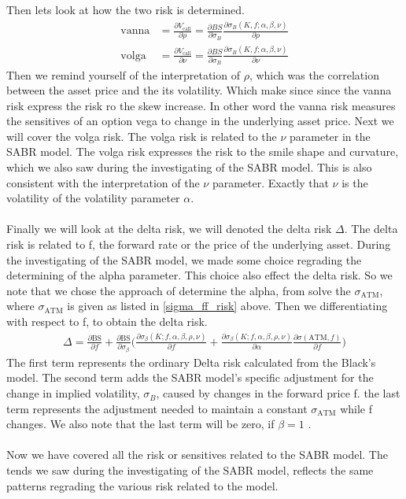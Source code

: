 \\\\
Then lets look at how the two risk is determined. 
\begin{align*}
    \text{vanna} &= \frac{\partial V_{\text{call}}}{\partial \rho} = \frac{\partial BS}{\partial \sigma_B} \frac{\partial \sigma_B(K, f; \alpha, \beta, \nu)}{\partial \rho} \\
    \text{volga} &= \frac{\partial V_{\text{call}}}{\partial \nu} = \frac{\partial BS}{\partial \sigma_B} \frac{\partial \sigma_B(K, f; \alpha, \beta, \nu)}{\partial \nu}
\end{align*}
Then we remind yourself of the interpretation of $\rho$,
which was the correlation between the asset price and the its 
volatility. Which make since since the vanna risk express
the risk ro the skew increase. In other word the vanna risk 
measures the sensitives of an option  vega to change in 
the underlying asset price. Next we will cover the volga risk.
The volga risk is related to the $\nu$ parameter in the SABR model. 
The volga risk expresses the risk to the smile shape and curvature,
which we also saw during the investigating of the SABR model. 
This is also consistent with the interpretation of the $\nu$ parameter. 
Exactly that $\nu$ is the volatility of the volatility parameter $\alpha$.
\\\\
Finally we will look at the delta risk, we will denoted
the delta risk $\Delta$. The delta risk is related to f, the 
forward rate or the price of the underlying asset. 
During the investigating of the SABR model, we made
some choice regrading the determining of the alpha parameter.
This choice also effect the delta risk. So we note that
we chose the approach of determine the alpha, from solve the
$\sigma_{\text{ATM}}$, where $\sigma_{\text{ATM}}$ is given as 
listed in \autoref{sigma_ff_risk} above. 
Then we differentiating with respect to f, to obtain the delta risk. 
\begin{align}
    \Delta = \frac{\partial \text{BS}}{\partial f} +
     \frac{\partial \text{BS}}{\partial \sigma_\beta} 
     \Big({\frac{\partial \sigma_\beta(K; f, \alpha, \beta, \rho, \nu)}
     {\partial f}  + \frac{\partial \sigma_\beta(K; f, \alpha, \beta,
     \rho, \nu)}{\partial \alpha} 
     \frac{\partial \sigma(\text{ATM}, f)}{\partial f}}\Big)
\end{align}
The first term represents the ordinary Delta risk calculated from 
the Black's model. The second term adds the SABR model's
 specific adjustment for the change in implied volatility, 
$\sigma_B$, caused by changes in the forward price f.
the last term represents the adjustment needed to maintain a constant 
$\sigma_{\text{ATM}}$ while f changes.
We also note that the last term will be zero, if $\beta=1$ \cite{Smile}.
\\\\
Now we have covered all the risk or sensitives related to the SABR model. 
The tends we saw during the investigating of the SABR model, reflects
the same patterns regrading the various risk related to the model. 